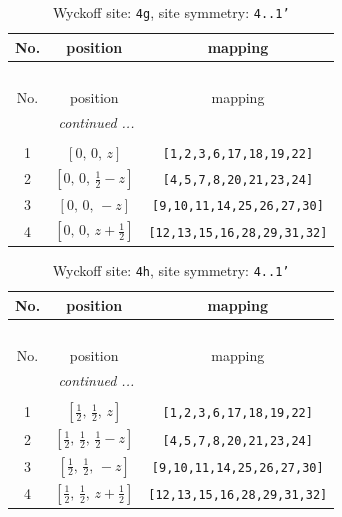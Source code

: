 \documentclass[fleqn,8pt]{jsarticle}
\begin{document}
\renewcommand{\arraystretch}{1.2}
\begin{longtable}{ccc}
\caption{Wyckoff site: {\tt 4g}, site symmetry: {\tt 4..1'}}
 \\
 \hline \hline
No. & position & mapping \\ \hline \endfirsthead

\multicolumn{2}{l}{\tablename\ \thetable{}} \\
 \hline \hline
No. & position & mapping \\ \hline \endhead

 \hline \hline
\multicolumn{2}{r}{\footnotesize\it continued ...} \\ \endfoot

 \hline \hline
\multicolumn{2}{r}{} \\ \endlastfoot

1 & $\left[ 0,\, 0,\, z \right]$ & {\tt [1,2,3,6,17,18,19,22]} \\ \hline
2 & $\left[ 0,\, 0,\, \frac{1}{2} - z \right]$ & {\tt [4,5,7,8,20,21,23,24]} \\ \hline
3 & $\left[ 0,\, 0,\, - z \right]$ & {\tt [9,10,11,14,25,26,27,30]} \\ \hline
4 & $\left[ 0,\, 0,\, z + \frac{1}{2} \right]$ & {\tt [12,13,15,16,28,29,31,32]} \\
\end{longtable}
\renewcommand{\arraystretch}{1.2}
\begin{longtable}{ccc}
\caption{Wyckoff site: {\tt 4h}, site symmetry: {\tt 4..1'}}
 \\
 \hline \hline
No. & position & mapping \\ \hline \endfirsthead

\multicolumn{2}{l}{\tablename\ \thetable{}} \\
 \hline \hline
No. & position & mapping \\ \hline \endhead

 \hline \hline
\multicolumn{2}{r}{\footnotesize\it continued ...} \\ \endfoot

 \hline \hline
\multicolumn{2}{r}{} \\ \endlastfoot

1 & $\left[ \frac{1}{2},\, \frac{1}{2},\, z \right]$ & {\tt [1,2,3,6,17,18,19,22]} \\ \hline
2 & $\left[ \frac{1}{2},\, \frac{1}{2},\, \frac{1}{2} - z \right]$ & {\tt [4,5,7,8,20,21,23,24]} \\ \hline
3 & $\left[ \frac{1}{2},\, \frac{1}{2},\, - z \right]$ & {\tt [9,10,11,14,25,26,27,30]} \\ \hline
4 & $\left[ \frac{1}{2},\, \frac{1}{2},\, z + \frac{1}{2} \right]$ & {\tt [12,13,15,16,28,29,31,32]} \\
\end{longtable}
\end{document}
